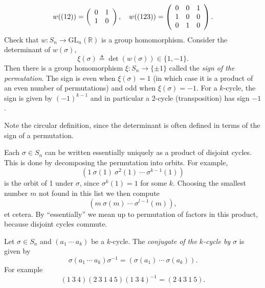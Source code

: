 \begin{xmpl}
$$
w((12)) = \left(\begin{array}{c c}
            0 & 1 \\ 1 & 0
          \end{array}\right), \quad
w((123)) = \left(\begin{array}{c c c}
             0 & 0 & 1 \\ 1 & 0 & 0 \\ 0 & 1 & 0
           \end{array}\right).
$$
Check that $w : S_n \to \mathrm{GL}_n(\mathbb{R})$ is a group
homomorphism. Consider the determinant of $w(\sigma)$,
$$
\xi(\sigma) \triangleq \det(w(\sigma)) \in \{1, -1\}.
$$
Then there is a group homomorphism $\xi : S_n \to \{ \pm 1 \}$ called
the \emph{sign of the permutation}. The sign is even when $\xi(\sigma)
= 1$ (in which case it is a product of an even number of permutations)
and odd when $\xi(\sigma) = -1$. For a $k$-cycle, the sign is
given by $(-1)^{k-1}$ and in particular a 2-cycle (transposition) has
sign $-1$.

Note the circular definition, since the determinant is often defined
in terms of the sign of a permutation.
\end{xmpl}

\begin{remark}
Each $\sigma \in S_n$ can be written essentially uniquely as a product
of disjoint cycles. This is done by decomposing the permutation into
orbits. For example,
$$
(1 ~ \sigma(1) ~ \sigma^2(1) ~ \cdots ~ \sigma^{k-1}(1))
$$
is the orbit of 1 under $\sigma$, since $\sigma^k(1) = 1$ for some $k$.
Choosing the smallest number $m$ not found in this list we then compute
$$
(m ~ \sigma(m) ~ \cdots ~ \sigma^{l-1}(m)),
$$
et cetera. By ``essentially'' we mean up to permutation of factors in
this product, because disjoint cycles commute.
\end{remark}

\begin{theorem}
Let $\sigma \in S_n$ and $(a_1 ~ \cdots ~ a_k)$ be a $k$-cycle.
The \emph{conjugate of the $k$-cycle by $\sigma$} is given by
$$
\sigma(a_1 ~ \cdots ~ a_k)\sigma^{-1}
= (\sigma(a_1) ~ \cdots ~ \sigma(a_k)).
$$
For example
$$
(1 ~ 3 ~ 4) (2 ~ 3 ~ 1 ~ 4 ~ 5) (1 ~ 3 ~ 4)^{-1}
= (2 ~ 4 ~ 3 ~ 1 ~ 5).
$$
\end{theorem}

